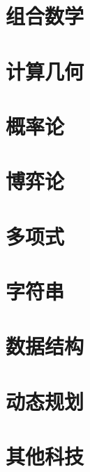 \documentclass[12pt,a4paper]{article}
\begin{document}
\newpage
\part{组合数学}

\newpage
\part{计算几何}

\newpage
\part{概率论}

\newpage
\part{博弈论}

\newpage
\part{多项式}

\newpage
\part{字符串}

\newpage
\part{数据结构}

\newpage
\part{动态规划}


\newpage
\part{其他科技}
\end{document}
